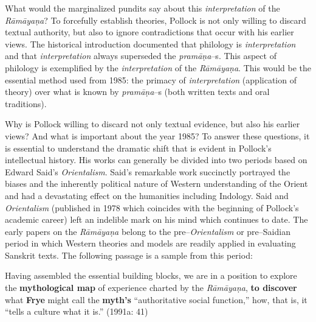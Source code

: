 What would the marginalized pundits say about this \textit{interpretation} of the \textit{Rāmāyaṇa}? To forcefully establish theories, Pollock is not only willing to discard textual authority, but also to ignore contradictions that occur with his earlier views. The historical introduction documented that philology is \textit{interpretation} and that \textit{interpretation }always superseded the \textit{pramāṇa}–s. This aspect of philology is exemplified by the \textit{interpretation }of the \textit{Rāmāyaṇa}. This would be the essential method used from 1985: the primacy of \textit{interpretation} (application of theory) over what is known by \textit{pramāṇa}–s (both written texts and oral traditions).

Why is Pollock willing to discard not only textual evidence, but also his earlier views? And what is important about the year 1985? To answer these questions, it is essential to understand the dramatic shift that is evident in Pollock’s intellectual history. His works can generally be divided into two periods based on Edward Said’s \textit{Orientalism}. Said’s remarkable work succinctly portrayed the biases and the inherently political nature of Western understanding of the Orient and had a devastating effect on the humanities including Indology. Said and \textit{Orientalism} (published in 1978 which coincides with the beginning of Pollock’s academic career) left an indelible mark on his mind which continues to date. The early papers on the \textit{Rāmāyaṇa }belong to the pre–\textit{Orientalism} or pre–Saidian period in which Western theories and models are readily applied in evaluating Sanskrit texts. The following passage is a sample from this period:

\begin{myquote}
Having assembled the essential building blocks, we are in a position to explore the \textbf{mythological map} of experience charted by the \textit{Rāmāyaṇa}, \textbf{to discover} what \textbf{Frye} might call the \textbf{myth’s} “authoritative social function,” how, that is, it “tells a culture what it is.” (1991a: 41)
\end{myquote}

